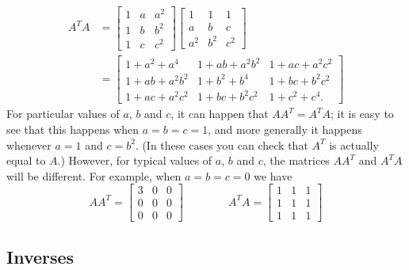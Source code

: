 \documentclass[a4paper]{book}
\newcommand{\bbm}       {\begin{bmatrix}}
\newcommand{\ebm}       {\end{bmatrix}}
\renewcommand{\:}{\colon}
\theoremstyle{definition}
\renewenvironment{solution}{\SolutionInline}{\endSolutionInline}
\begin{document}
\begin{solution}
\begin{itemize}
\begin{align*}
    A^TA &=
          \bbm
            1 & a & a^2 \\
            1 & b & b^2 \\
            1 & c & c^2
          \ebm
          \bbm
            1   & 1   & 1   \\
            a   & b   & c   \\
            a^2 & b^2 & c^2
          \ebm \\
         &=
          \bbm
           1 + a^2 + a^4   & 1 + ab + a^2b^2 & 1 + ac + a^2c^2 \\
           1 + ab + a^2b^2 & 1 + b^2 + b^4   & 1 + bc + b^2c^2 \\
           1 + ac + a^2c^2 & 1 + bc + b^2c^2 & 1 + c^2 + c^4.
          \ebm
   \end{align*}
   For particular values of $a$, $b$ and $c$, it can happen that
   $AA^T=A^TA$; it is easy to see that this happens when $a=b=c=1$,
   and more generally it happens whenever $a=1$ and $c=b^2$.  (In
   these cases you can check that $A^T$ is actually equal to $A$.)
   However, for typical values of $a$, $b$ and $c$, the matrices
   $AA^T$ and $A^TA$ will be different.  For example, when $a=b=c=0$
   we have
   \[ AA^T = \bbm
              3 & 0 & 0 \\
              0 & 0 & 0 \\
              0 & 0 & 0
             \ebm \hspace{4em}
      A^TA = \bbm
              1 & 1 & 1 \\
              1 & 1 & 1 \\
              1 & 1 & 1
             \ebm
   \]
 \end{itemize}
\end{solution}


\subsection{Inverses}
\label{subsec-mat-inv}
\end{document}
